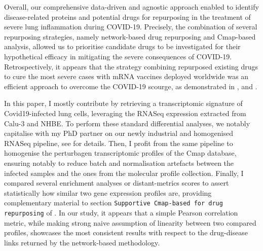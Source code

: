 Overall, our comprehensive data-driven and agnostic approach enabled to identify disease-related proteins and potential drugs for repurposing in the treatment of severe lung inflammation during COVID-19. Precisely, the combination of several repurposing strategies, namely network-based drug repurposing and Cmap-based analysis, allowed us to prioritise candidate drugs to be investigated for their hypothetical efficacy in mitigating the severe consequences of COVID-19. Retrospectively, it appears that the strategy combining repurposed existing drugs to cure the most severe cases with mRNA vaccines deployed worldwide was an efficient approach to overcome the COVID-19 scourge, as demonstrated in \autocite{yadav_etal}, \autocite{bellera_etal21} and \autocite{taibe_etal22}. 


In this paper, I mostly contribute by retrieving a transcriptomic signature of Covid19-infected lung cells, leveraging the RNASeq expression extracted from Calu-3 and NHBE. To perform these standard differential analyses, we notably capitalise with my PhD partner on our newly industrial and homogenised RNASeq pipeline, see  for details. Then, I profit from the same pipeline to homogenise the perturbagen transcriptomic profiles of the Cmap database, ensuring notably to reduce batch and normalisation artefacts between the infected samples and the ones from the molecular profile collection. Finally, I compared several enrichment analyses or distant-metrics scores to assert statistically how similar two gene expression profiles are, providing complementary material to section \texttt{Supportive Cmap-based for drug repurposing} of \autocite{desvaux_etal21}. In our study, it appears that a simple Pearson correlation metric, while making strong naive assumption of linearity between two compared profiles, showcases the most consistent results with respect to the drug-disease links returned by the network-based methodology. 

